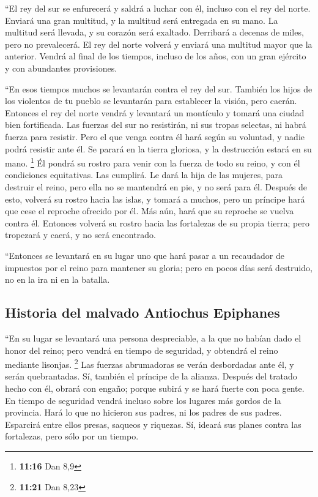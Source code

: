 \begin{paracol}{2}
 ``El rey del sur se enfurecerá y saldrá a luchar con él,
incluso con el rey del norte. Enviará una gran multitud, y la multitud
será entregada en su mano.  La multitud será llevada, y
su corazón será exaltado. Derribará a decenas de miles, pero no
prevalecerá.  El rey del norte volverá y enviará una
multitud mayor que la anterior. Vendrá al final de los tiempos, incluso
de los años, con un gran ejército y con abundantes provisiones.

 ``En esos tiempos muchos se levantarán contra el rey del
sur. También los hijos de los violentos de tu pueblo se levantarán para
establecer la visión, pero caerán.  Entonces el rey del
norte vendrá y levantará un montículo y tomará una ciudad bien
fortificada. Las fuerzas del sur no resistirán, ni sus tropas selectas,
ni habrá fuerza para resistir.  Pero el que venga contra
él hará según su voluntad, y nadie podrá resistir ante él. Se parará en
la tierra gloriosa, y la destrucción estará en su mano. \footnote{\textbf{11:16}
  Dan 8,9}  Él pondrá su rostro para venir con la fuerza
de todo su reino, y con él condiciones equitativas. Las cumplirá. Le
dará la hija de las mujeres, para destruir el reino, pero ella no se
mantendrá en pie, y no será para él.  Después de esto,
volverá su rostro hacia las islas, y tomará a muchos, pero un príncipe
hará que cese el reproche ofrecido por él. Más aún, hará que su reproche
se vuelva contra él.  Entonces volverá su rostro hacia
las fortalezas de su propia tierra; pero tropezará y caerá, y no será
encontrado.

 ``Entonces se levantará en su lugar uno que hará pasar a
un recaudador de impuestos por el reino para mantener su gloria; pero en
pocos días será destruido, no en la ira ni en la batalla.

\hypertarget{historia-del-malvado-antiochus-epiphanes}{%
\subsection{Historia del malvado Antiochus
Epiphanes}\label{historia-del-malvado-antiochus-epiphanes}}

 ``En su lugar se levantará una persona despreciable, a
la que no habían dado el honor del reino; pero vendrá en tiempo de
seguridad, y obtendrá el reino mediante lisonjas. \footnote{\textbf{11:21}
  Dan 8,23}  Las fuerzas abrumadoras se verán desbordadas
ante él, y serán quebrantadas. Sí, también el príncipe de la alianza.
 Después del tratado hecho con él, obrará con engaño;
porque subirá y se hará fuerte con poca gente.  En tiempo
de seguridad vendrá incluso sobre los lugares más gordos de la
provincia. Hará lo que no hicieron sus padres, ni los padres de sus
padres. Esparcirá entre ellos presas, saqueos y riquezas. Sí, ideará sus
planes contra las fortalezas, pero sólo por un tiempo.


\end{paracol}
